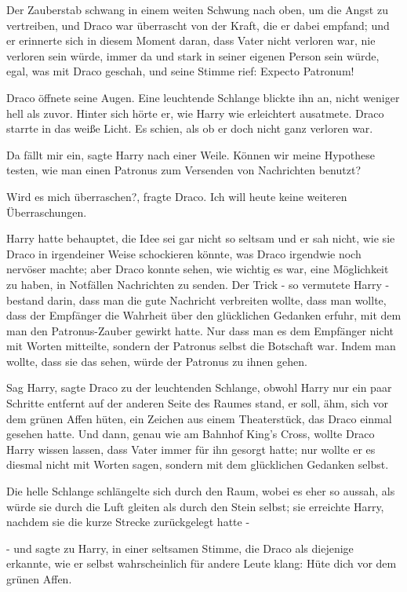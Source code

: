 Der Zauberstab schwang in einem weiten Schwung nach oben, um die Angst zu
vertreiben, und Draco war überrascht von der Kraft, die er dabei empfand; und er
erinnerte sich in diesem Moment daran, dass Vater nicht verloren war, nie
verloren sein würde, immer da und stark in seiner eigenen Person sein würde,
egal, was mit Draco geschah, und seine Stimme rief: \glqq{}Expecto Patronum!

Draco öffnete seine Augen. Eine leuchtende Schlange blickte ihn an, nicht
weniger hell als zuvor. Hinter sich hörte er, wie Harry wie erleichtert
ausatmete. Draco starrte in das weiße Licht. Es schien, als ob er doch nicht
ganz verloren war.

\glqq{}Da fällt mir ein\grqq{}, sagte Harry nach einer Weile. \glqq{}Können wir
meine Hypothese testen, wie man einen Patronus zum Versenden von Nachrichten
benutzt?\grqq{}

\glqq{}Wird es mich überraschen?\grqq{}, fragte Draco. \glqq{}Ich will heute keine
weiteren Überraschungen.\grqq{}

Harry hatte behauptet, die Idee sei gar nicht so seltsam und er sah nicht, wie
sie Draco in irgendeiner Weise schockieren könnte, was Draco irgendwie noch
nervöser machte; aber Draco konnte sehen, wie wichtig es war, eine Möglichkeit
zu haben, in Notfällen Nachrichten zu senden. Der Trick - so vermutete Harry -
bestand darin, dass man die gute Nachricht verbreiten wollte, dass man wollte,
dass der Empfänger die Wahrheit über den glücklichen Gedanken erfuhr, mit dem
man den Patronus-Zauber gewirkt hatte. Nur dass man es dem Empfänger nicht mit
Worten mitteilte, sondern der Patronus selbst die Botschaft war. Indem man
wollte, dass sie das sehen, würde der Patronus zu ihnen gehen.\grqq{}

Sag Harry\grqq{}, sagte Draco zu der leuchtenden Schlange, obwohl Harry nur ein
paar Schritte entfernt auf der anderen Seite des Raumes stand, \glqq{}er soll,
ähm, sich vor dem grünen Affen hüten\grqq{}, ein Zeichen aus einem Theaterstück,
das Draco einmal gesehen hatte. Und dann, genau wie am Bahnhof King's Cross,
wollte Draco Harry wissen lassen, dass Vater immer für ihn gesorgt hatte; nur
wollte er es diesmal nicht mit Worten sagen, sondern mit dem glücklichen
Gedanken selbst.

Die helle Schlange schlängelte sich durch den Raum, wobei es eher so aussah, als
würde sie durch die Luft gleiten als durch den Stein selbst; sie erreichte
Harry, nachdem sie die kurze Strecke zurückgelegt hatte -

- und sagte zu Harry, in einer seltsamen Stimme, die Draco als diejenige
erkannte, wie er selbst wahrscheinlich für andere Leute klang: \glqq{}Hüte dich
vor dem grünen Affen.\grqq{}

